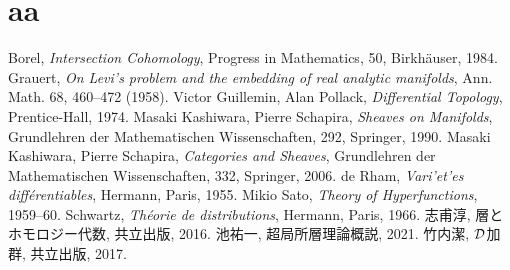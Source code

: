\backmatter
\appendix
\chapter{aa}
\begin{thebibliography}{20} 
     Borel, 
        \textit{Intersection Cohomology}, 
        Progress in Mathematics, 50, Birkh\"auser, 1984.
     Grauert, 
        \textit{On Levi's problem and the embedding of real analytic manifolds}, 
        Ann. Math. 68, 460--472 (1958).
     Victor Guillemin, Alan Pollack, 
        \textit{Differential Topology}, 
        Prentice-Hall, 1974.
     Masaki Kashiwara, Pierre Schapira, 
        \textit{Sheaves on Manifolds}, 
        Grundlehren der Mathematischen Wissenschaften, 292, Springer, 1990.
     Masaki Kashiwara, Pierre Schapira, 
        \textit{Categories and Sheaves}, 
        Grundlehren der Mathematischen Wissenschaften, 332, Springer, 2006.
     de Rham, 
        \textit{Vari'et'es diff\'erentiables}, 
        Hermann, Paris, 1955.
     Mikio Sato, 
        \textit{Theory of Hyperfunctions}, 
        1959--60.
     Schwartz, 
        \textit{Th\'eorie de distributions}, 
        Hermann, Paris, 1966.
     志甫淳, 層とホモロジー代数, 共立出版, 2016.
     池祐一, 超局所層理論概説, 2021.
     竹内潔, \(\mathcal{D}\)加群, 共立出版, 2017.
\end{thebibliography}




